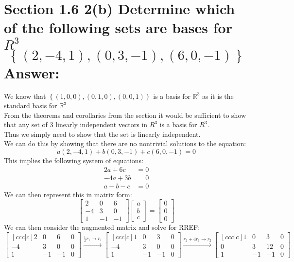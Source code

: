 \documentclass{article}
\begin{document}
\section*{Section 1.6 2(b)
Determine which of the following sets are bases for $R^3$ 
$$ \left\{ (2,-4,1), (0,3,-1), (6, 0, -1)\right\}$$
\textbf{Answer:} \\}
We know that $\left\{(1,0,0),(0,1,0),(0,0,1) \right\}$ is a basis for $\mathds{R}^3$ as it is the standard basis for $\mathds{R}^3$\\
From the theorems and corollaries from the section it would be sufficient to show that any set of 3 linearly independent vectors in $R^3$ is a basis for $R^3$.\\
Thus we simply need to show that the set is linearly independent.\\
We can do this by showing that there are no nontrivial solutions to the equation:
$$ a(2,-4,1) + b(0,3,-1) + c(6,0,-1) = 0$$
This implies the following system of equations:
\begin{align*}
    2a + 6c &= 0\\
    -4a + 3b &= 0\\
    a - b - c &= 0
\end{align*}
We can then represent this in matrix form:
$$ \begin{bmatrix}
    2 & 0 & 6 \\
    -4 & 3 & 0 \\
    1 & -1 & -1
\end{bmatrix} \begin{bmatrix}
    a \\ b \\ c
\end{bmatrix} = \begin{bmatrix}
    0 \\ 0 \\ 0
\end{bmatrix} $$
We can then consider the augmented matrix and solve for RREF:
$$ \begin{bmatrix}[ccc|c]
    2 & 0 & 6 & 0\\
    -4 & 3 & 0 & 0\\
    1 & -1 & -1 & 0
\end{bmatrix} \xrightarrow{\frac{1}{2} r_1 \rightarrow r_1} \begin{bmatrix}[ccc|c]
    1 & 0 & 3 & 0\\
    -4 & 3 & 0 & 0\\
    1 & -1 & -1 & 0
\end{bmatrix} \xrightarrow{r_2 + 4r_1 \rightarrow r_2} \begin{bmatrix}[ccc|c]
    1 & 0 & 3 & 0\\
    0 & 3 & 12 & 0\\
    1 & -1 & -1 & 0
\end{bmatrix}$$
\end{document}
